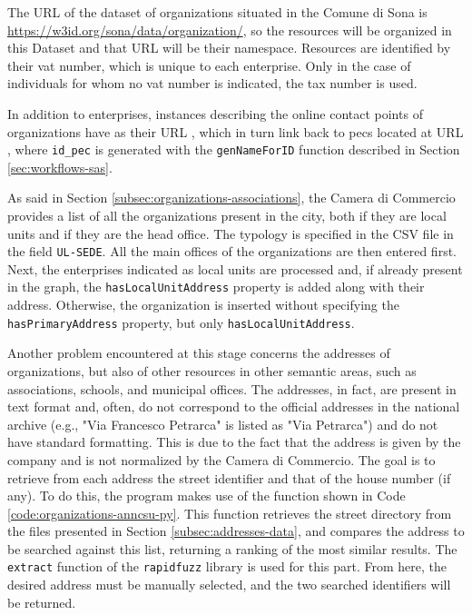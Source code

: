 The \ac{URL} of the dataset of organizations situated in the Comune di Sona is \url{https://w3id.org/sona/data/organization/}, so the resources will be organized in this Dataset and that \ac{URL} will be their namespace. Resources are identified by their vat number, which is unique to each enterprise. Only in the case of individuals for whom no vat number is indicated, the tax number is used.

In addition to enterprises, instances describing the online contact points of organizations have as their \ac{URL} , which in turn link back to pecs located at \ac{URL} , where \verb#id_pec# is generated with the \verb#genNameForID# function described in Section \ref{sec:workflows-sas}.

As said in Section \ref{subsec:organizations-associations}, the Camera di Commercio provides a list of all the organizations present in the city, both if they are local units and if they are the head office. The typology is specified in the \ac{CSV} file in the field \verb#UL-SEDE#. All the main offices of the organizations are then entered first. Next, the enterprises indicated as local units are processed and, if already present in the graph, the \verb#hasLocalUnitAddress# property is added along with their address. Otherwise, the organization is inserted without specifying the \verb#hasPrimaryAddress# property, but only \verb#hasLocalUnitAddress#.

Another problem encountered at this stage concerns the addresses of organizations, but also of other resources in other semantic areas, such as associations, schools, and municipal offices. The addresses, in fact, are present in text format and, often, do not correspond to the official addresses in the national archive (e.g., "Via Francesco Petrarca" is listed as "Via Petrarca") and do not have standard formatting. This is due to the fact that the address is given by the company and is not normalized by the Camera di Commercio. The goal is to retrieve from each address the street identifier and that of the house number (if any). To do this, the program makes use of the function shown in Code \ref{code:organizations-anncsu-py}. This function retrieves the street directory from the files presented in Section \ref{subsec:addresses-data}, and compares the address to be searched against this list, returning a ranking of the most similar results. The \verb#extract# function of the \verb#rapidfuzz# library is used for this part. From here, the desired address must be manually selected, and the two searched identifiers will be returned.

